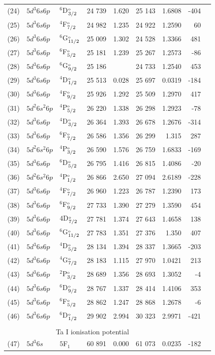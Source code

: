 \documentclass[10pt,a4paper, twoside, openright]{report}
\begin{document}
{\begin{longtable}{cllcrrrrr}
(24)  &$5d^3 6s 6p$ & $^6$D$^{\rm_o}_{3/2}$   & 24 739 & 1.620 & 25 143 & 1.6808& -404 \\
(25)  &$5d^3 6s 6p$ & $^4$F$^{\rm_o}_{7/2}$    & 24 982 & 1.235  & 24 922 & 1.2590 & 60 \\
(26)  &$5d^3 6s 6p$ & $^6$G$^{\rm_o}_{11/2}$ & 25 009 & 1.302 & 24 528 & 1.3366 & 481 \\
(27)  &$5d^3 6s 6p$ & $^6$F$^{\rm_o}_{5/2}$ &   25 181 & 1.239 & 25 267 & 1.2573 & -86 \\
(28)  &$5d^3 6s 6p$ & $^6$G$^{\rm_o}_{9/2}$ &   25 186 &  & 24 733  & 1.2540 & 453 \\
(29)  &$5d^3 6s 6p$ & $^4$D$^{\rm_o}_{1/2}$ &   25 513 & 0.028 & 25 697 & 0.0319  & -184 \\
(30)  &$5d^3 6s 6p$ & $^4$F$^{\rm_o}_{9/2}$  &   25 926 &  1.292 & 25 509 & 1.2970 & 417 \\
(31)  &$5d^2 6s^2 6p$ & $^4$P$^{\rm_o}_{5/2}$ &  26 220 & 1.338 & 26 298 & 1.2923 & -78 \\
(32)  &$5d^3 6s 6p$ & $^4$D$^{\rm_o}_{3/2}$ &   26 364 & 1.393 & 26 678 & 1.2676 & -314 \\
(33)  &$5d^3 6s 6p$ & $^6$F$^{\rm_o}_{7/2}$  &  26 586 & 1.356  & 26 299 & 1.315 & 287 \\
(34)  &$5d^2 6s^2 6p$ & $^4$P$^{\rm_o}_{3/2}$   & 26 590 & 1.576 & 26 759 & 1.6833 & -169\\
(35)  &$5d^3 6s 6p$ & $^6$D$^{\rm_o}_{5/2}$ &   26 795 & 1.416 & 26 815 & 1.4086 & -20 \\
(36)  &$5d^2 6s^2 6p$ & $^4$P$^{\rm_o}_{1/2}$ &   26 866 & 2.650 & 27 094 & 2.6189 & -228\\
(37)  &$5d^3 6s 6p$ &  $^4$F$^{\rm_o}_{7/2}$   &   26 960 & 1.223  & 26 787 & 1.2390 & 173 \\
(38)  &$5d^3 6s 6p$ & $^6$F$^{\rm_o}_{9/2}$  &   27 733 &  1.390 & 27 279 & 1.3590 & 454 \\
(39)  &$5d^3 6s 6p$ & $4$D$^{\rm_o}_{7/2}$   &   27 781 & 1.374  & 27 643 & 1.4658 & 138 \\
(40)  &$5d^3 6s 6p$ & $^6$G$^{\rm_o}_{11/2}$ &   27 783 & 1.351 &  27 376 & 1.350  & 407\\
(41)  &$5d^3 6s 6p$ & $^4$D$^{\rm_o}_{5/2}$ &   28 134 & 1.394 & 28 337 & 1.3665 & -203 \\
(42)  &$5d^3 6s 6p$ & $^4$G$^{\rm_o}_{7/2}$   &   28 183 & 1.115  & 27 970 & 1.0421 & 213 \\
(43) &$5d^3 6s 6p$ & $^2$P$^{\rm_o}_{3/2}$   &   28 689 & 1.356  & 28 693 & 1.3052  & -4 \\
(44)  &$5d^3 6s 6p$ & $^6$D$^{\rm_o}_{9/2}$  &   28 767 &  1.337 & 28 414 & 1.4106 & 353 \\
(45)  &$5d^3 6s 6p$ & $^6$F$^{\rm_o}_{5/2}$ &   28 862 & 1.247 & 28 868 & 1.2678 & -6 \\
(46)  &$5d^3 6s 6p$ & $^6$D$^{\rm_o}_{1/2}$ &   29 902 & 2.994 & 30 323 & 2.9971 & -421 \\
\\
\multicolumn{5}{r}{ Ta I ionisation potential} \\
(47)  &$5d^3 6s$& $5$F$_1$  & 60 891 & 0.000 & 61 073 &    0.0235 &  -182\\
\bottomrule
\bottomrule
\end{longtable}
}
\end{document}
